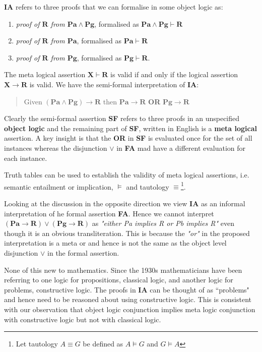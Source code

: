  {\bf IA}  refers to three proofs that we can formalise in some object logic as:
\begin{enumerate}
\item \emph{proof of $\mathbf{R}$ from $\mathbf{Pa\wedge Pg}$}, formalised as $\mathbf{Pa\wedge Pg \vdash R}$ 
\item \emph{proof of  $\mathbf{R}$ from $\mathbf{Pa}$}, formalised as $\mathbf{Pa \vdash R}$  
\item \emph{proof of $\mathbf{R}$ from $\mathbf{Pg}$}, formalised as $\mathbf{Pg \vdash R}$. 
\end{enumerate}
The meta logical assertion  $\mathbf{X \vdash R}$ is valid if and only if the logical assertion $\mathbf{X \rightarrow R}$ is valid.
We have the semi-formal interpretation of {\bf IA}:
\begin{quotation}
Given $\mathbf{(Pa\wedge Pg) \rightarrow R}$   then  $\mathbf{Pa \rightarrow R }$ {\bf OR} $\mathbf{Pg \rightarrow R}$   \hspace{\fill}{\bf SF}
\end{quotation}
Clearly the semi-formal assertion {\bf SF}  refers to three proofs in an unspecified {\bf object logic} and the remaining part of {\bf SF}, written in English is a {\bf meta logical} assertion. A key insight is that the {\bf OR} in {\bf SF} is evaluated once  for the set of all instances whereas the disjunction $\vee$ in {\bf FA} mad have a different  evaluation for each instance. 

Truth tables can be used to establish the validity of meta logical assertions, i.e. semantic entailment or implication, $\vDash$ and tautology $\equiv$\footnote{Let tautology $A\equiv G$ be defined as $A\vDash G$ and $G\vDash A$}. 

Looking at the discussion in the opposite direction we view {\bf IA} as an informal interpretation of he formal assertion {\bf FA}. Hence we cannot interpret $\mathbf{(Pa\rightarrow R)\vee (Pg \rightarrow R)}$  as \emph{"either Pa implies R or Pb implies R"} even though it is an obvious transliteration. This is because the \emph{"or"} in the proposed interpretation is a meta or and hence is not the same as the object level disjunction $\vee$ in the formal assertion.

%
 


None of this new to mathematics. Since the 1930s mathematicians have been referring to one logic for propositions, classical logic, and another logic for problems, constructive logic. The proofs in {\bf IA} can be thought of  as ``problems" and hence need to be reasoned about using constructive logic. This is consistent with our observation that object logic conjunction  implies meta logic conjunction with constructive logic but not with classical logic. 


